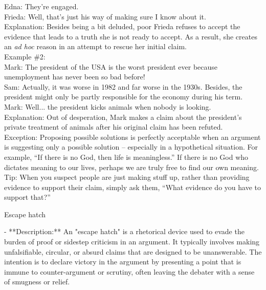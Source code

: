 \documentclass[a4paper,12pt,single,pdftex]{scrbook}
\begin{document}
{    
      Edna: They’re engaged.
    \\

    
      Frieda: Well, that’s just his way of making sure I know about it.
    \\

    
      Explanation: Besides being a bit deluded, poor Frieda refuses to accept the evidence that leads to a truth she is not ready to accept.  As a result, she creates an {\it ad hoc} reason in an attempt to rescue her initial claim.
    \\

    
      Example \#2:
    \\

    
      Mark: The president of the USA is the worst president ever because unemployment has never been so bad before!
    \\

    
      Sam: Actually, it was worse in 1982 and far worse in the 1930s.  Besides, the president might only be partly responsible for the economy during his term.
    \\

    
      Mark: Well... the president kicks animals when nobody is looking.
    \\

    
      Explanation: Out of desperation, Mark makes a claim about the president's private treatment of animals after his original claim has been refuted.
    \\

    
      Exception: Proposing possible solutions is perfectly acceptable when an argument is suggesting only a possible solution -- especially in a hypothetical situation. For example, “If there is no God, then life is meaningless.”  If there is no God who dictates meaning to our lives, perhaps we are truly free to find our own meaning.
    \\

    
      Tip: When you suspect people are just making stuff up, rather than providing evidence to support their claim, simply ask them, “What evidence do you have to support that?”
    \\

  }


Escape hatch
    
      - **Description:** An "escape hatch" is a rhetorical device used to evade the burden of proof or sidestep criticism in an argument. It typically involves making unfalsifiable, circular, or absurd claims that are designed to be unanswerable. The intention is to declare victory in the argument by presenting a point that is immune to counter-argument or scrutiny, often leaving the debater with a sense of smugness or relief.
    \\
\end{document}
